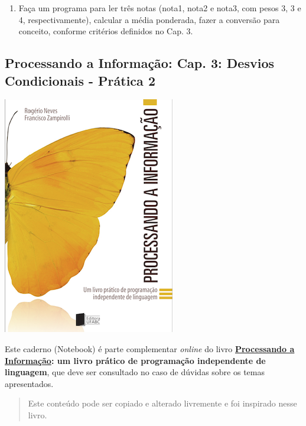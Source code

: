 \documentclass[12pt,a4paper]{article}
\providecommand{\tightlist}{%
      \setlength{\itemsep}{0pt}\setlength{\parskip}{0pt}}
\begin{document}
\begin{enumerate}
\def\labelenumi{\arabic{enumi}.}
\setcounter{enumi}{4}
\tightlist
\item
  Faça um programa para ler três notas (nota1, nota2 e nota3, com pesos
  3, 3 e 4, respectivamente), calcular a média ponderada, fazer a
  conversão para conceito, conforme critérios definidos no Cap. 3.
\end{enumerate}

    \hypertarget{processando-a-informauxe7uxe3o-cap.-3-desvios-condicionais---pruxe1tica-2}{%
\subsection{Processando a Informação: Cap. 3: Desvios Condicionais -
Prática
2}\label{processando-a-informauxe7uxe3o-cap.-3-desvios-condicionais---pruxe1tica-2}}

    \includegraphics{"figs/Capa_Processando_Informacao.jpg"}

Este caderno (Notebook) é parte complementar \emph{online} do livro
\textbf{\href{https://editora.ufabc.edu.br/matematica-e-ciencias-da-computacao/58-processando-a-informacao}{Processando
a Informação}: um livro prático de programação independente de
linguagem}, que deve ser consultado no caso de dúvidas sobre os temas
apresentados.

\begin{quote}
Este conteúdo pode ser copiado e alterado livremente e foi inspirado
nesse livro.
\end{quote}
\end{document}
